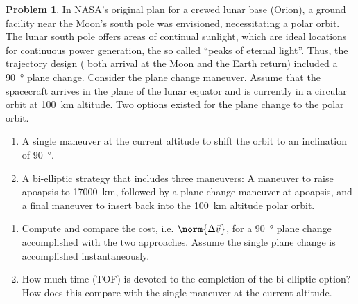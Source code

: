 \documentclass[10pt]{article}
\theoremstyle{definition}
\newtheorem{prob}{Problem}[section]
\newenvironment{subprob}%
{\renewcommand{\theenumi}{\alph{enumi}}\renewcommand{\labelenumi}{(\theenumi)}\begin{enumerate}}%
{\end{enumerate}}%
\begin{document}
\clearpage\newpage
\begin{prob}
    In NASA's original plan for a crewed lunar base (Orion), a ground facility near the Moon's south pole was envisioned, necessitating a polar orbit.
    The lunar south pole offers areas of continual sunlight, which are ideal locations for continuous power generation, the so called ``peaks of eternal light''.
    Thus, the trajectory design ( both arrival at the Moon and the Earth return) included a \SI{90}{\degree} plane change.
    Consider the plane change maneuver. 
    Assume that the spacecraft arrives in the plane of the lunar equator and is currently in a circular orbit at \SI{100}{\kilo\meter} altitude.
    Two options existed for the plane change to the polar orbit.
    \begin{enumerate}
        \item A single maneuver at the current altitude to shift the orbit to an inclination of \SI{90}{\degree}.
        \item A bi-elliptic strategy that includes three maneuvers: A maneuver to raise apoapsis to \SI{17000}{\kilo\meter}, followed by a plane change maneuver at apoapsis, and a final maneuver to insert back into the \SI{100}{\kilo\meter} altitude polar orbit.
    \end{enumerate}

    \begin{subprob}
    \item Compute and compare the cost, i.e. \( \norm{\Delta \vec v} \), for a \SI{90}{\degree} plane change accomplished with the two approaches.
        Assume the single plane change is accomplished instantaneously. 
    \item How much time (TOF) is devoted to the completion of the bi-elliptic option? 
        How does this compare with the single maneuver at the current altitude.
    \end{subprob}
\end{prob}
\end{document}
